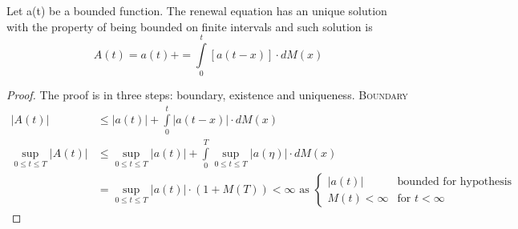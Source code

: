 \begin{theorem}[4.1 K.T. p.184]
  Let a(t) be a bounded function. The renewal equation has an unique solution with
  the property of being bounded on finite intervals and such solution is
  \begin{equation}
    A(t) = a(t) + =\int\limits_0^{t}[a(t-x)] \cdot dM(x)
  \end{equation}
\end{theorem}
\begin{proof}
  The proof is in three steps: boundary, existence and uniqueness.
  \proofpart
  \textsc{Boundary}\label{req:boundary}
  \begin{equation}\begin{split}
    |A(t)| & \le |a(t)| + \int\limits_0^{t}|a(t-x)| \cdot dM(x) \\
    \sup_{0\le t \le T} |A(t)| & \le \sup_{0\le t \le T} |a(t)| + \int\limits_0^{T}\sup_{0\le t \le T}|a(\eta)| \cdot dM(x)  \\
    & = \sup_{0\le t \le T} |a(t)| \cdot (1+M(T)) < \infty \text{ as }
    \begin{cases}
      |a(t)| & \text{bounded for hypothesis} \\
      M(t) < \infty & \text{for } t<\infty
    \end{cases}
  \end{split}\end{equation}


\end{proof}
